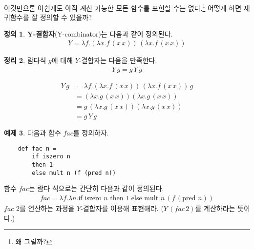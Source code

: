 \documentclass[b5paper, 11pt]{book}
\theoremstyle{definition}
\newtheorem{defn}{정의}[chapter]
\newtheorem{thm}[defn]{정리}
\newtheorem{ex}[defn]{예제}
\newenvironment{pf*}{\pushQED{\qed}\pf}
{\popQED\endpf}
\begin{document}
이것만으론 아쉽게도 아직 계산 가능한 모든 함수를 표현할 수는 없다.\footnote{왜 그럴까?} 어떻게 하면 재귀함수를 잘 정의할 수 있을까? 
\begin{defn}
    \textbf{Y-결합자}(Y-combinator)는 다음과 같이 정의된다.
    \begin{align*}
        Y = \lambda f.(\lambda x. f \, (x\, x)) \, (\lambda x. f \, (x \, x))
    \end{align*}
\end{defn}
\begin{thm}
    람다식 $g$에 대해 $Y$-결합자는 다음을 만족한다.
    \begin{align*}
        Y \, g = g \, Y \, g
    \end{align*}
\end{thm}
\begin{pf*}
    \begin{align*}
        Y \, g &= \lambda f.(\lambda x. f \, (x\, x)) \, (\lambda x. f \, (x \, x)) \, g \\
        &= (\lambda x. g \, (x \, x)) (\lambda x .g \, (x \, x)) \\ 
        &= g \,  (\lambda x. g \, (x \, x)) (\lambda x .g \, (x \, x))  \\ 
        &= g \, Y \, g
    \end{align*}
\end{pf*}
\begin{ex}
    다음과 함수 $fac$를 정의하자.
    \begin{lstlisting}
    def fac n =
        if iszero n 
        then 1 
        else mult n (f (pred n))
    \end{lstlisting}
    함수 $fac$는 람다 식으로는 간단히 다음과 같이 정의된다.
    \begin{align*}
        fac = \lambda f. \lambda n. \text{if } \text{iszero } n \text{ then }
        1 \text{ else } \text{mult } n \, (f \, (\text{pred } n))
    \end{align*}
    $fac$ 2를 연산하는 과정을 $Y$-결합자를 이용해 표현해라. ($Y \, (fac \, 2)$를 계산하라는 뜻이다.)
\end{ex}
\end{document}
